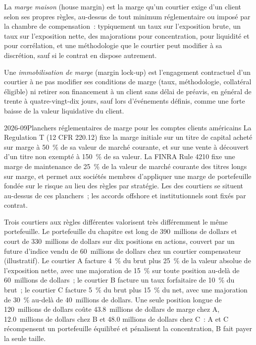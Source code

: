 \begin{definition}\label{def:fm:treasury-and-funding:house}
La \emph{marge maison} (house margin) est la marge qu'un courtier exige d'un client selon ses propres règles, au-dessus de tout minimum réglementaire ou imposé par la
chambre de compensation~: typiquement un taux sur l'exposition brute, un taux sur l'exposition nette, des majorations pour concentration, pour liquidité et pour corrélation, et une méthodologie que le courtier
peut modifier à sa discrétion, sauf si le contrat en dispose autrement.
\end{definition}

\begin{definition}\label{def:fm:treasury-and-funding:lockup}
Une \emph{immobilisation de marge} (margin lock-up) est l'engagement contractuel d'un courtier à ne pas modifier ses conditions de marge (taux, méthodologie, collatéral
éligible) ni retirer son financement à un client sans délai de préavis, en général de trente à quatre-vingt-dix jours, sauf lors d'événements définis, comme une
forte baisse de la valeur liquidative du client.
\end{definition}

\begin{dated}{2026-09}{Planchers réglementaires de marge pour les comptes clients américains}\label{dat:fm:treasury-and-funding:rules}
La Regulation T (12 CFR 220.12) fixe la marge initiale sur un titre de capital acheté sur marge à 50~\% de sa valeur de marché courante, et sur une vente à découvert d'un
titre non exempté à 150~\% de sa valeur. La FINRA Rule 4210 fixe une marge de maintenance de 25~\% de la valeur de marché courante des titres longs sur marge,
et permet aux sociétés membres d'appliquer une marge de portefeuille fondée sur le risque au lieu des règles par stratégie. Les  des courtiers se situent au-dessus de ces planchers~; les
accords offshore et institutionnels sont fixés par contrat.
\end{dated}

Trois courtiers aux règles différentes valorisent très différemment le même portefeuille. Le portefeuille du chapitre est long de 390~millions de dollars et court de 330~millions de dollars sur dix
positions en actions, couvert par un future d'indice vendu de 60~millions de dollars chez un courtier compensateur (illustratif). Le courtier A facture 4~\% du brut plus 25~\% de
la valeur absolue de l'exposition nette, avec une majoration de 15~\% sur toute position au-delà de 60~millions de dollars~; le courtier B facture un taux forfaitaire de 10~\% du brut~; le courtier C facture 5~\% du brut plus
15~\% du net, avec une majoration de 30~\% au-delà de 40~millions de dollars. Une seule position longue de 120~millions de dollars coûte 43.8~millions de dollars de marge chez A, 12.0~millions de dollars chez B et 48.0
millions de dollars chez C~: A et C récompensent un portefeuille équilibré et pénalisent la concentration, B fait payer la seule taille.

